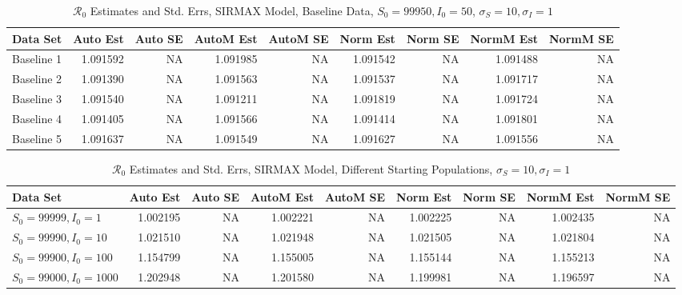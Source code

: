 \documentclass[12pt]{article}
\newcommand{\rr}{\ensuremath{\mathcal{R}_0}}
\begin{document}
\begin{table}[H]
	
	\caption{$\rr$ Estimates and Std. Errs, SIRMAX Model,
		Baseline Data, $S_0 = 99950, I_0 = 50$, 
		$\sigma_S = 10, \sigma_I = 1$}
	\begin{footnotesize}
		\hskip -1cm
	\begin{tabular}{l|r|r|r|r|r|r|r|r}
		\hline
		Data Set & Auto Est & Auto SE & AutoM Est & AutoM SE & Norm Est & Norm SE & NormM Est & NormM SE\\
		\hline
		Baseline 1 & 1.091592 & NA & 1.091985 & NA & 1.091542 & NA & 1.091488 & NA\\
		\hline
		Baseline 2 & 1.091390 & NA & 1.091563 & NA & 1.091537 & NA & 1.091717 & NA\\
		\hline
		Baseline 3 & 1.091540 & NA & 1.091211 & NA & 1.091819 & NA & 1.091724 & NA\\
		\hline
		Baseline 4 & 1.091405 & NA & 1.091566 & NA & 1.091414 & NA & 1.091801 & NA\\
		\hline
		Baseline 5 & 1.091637 & NA & 1.091549 & NA & 1.091627 & NA & 1.091556 & NA\\
		\hline
	\end{tabular}
\end{footnotesize}
\end{table}

\begin{table}[H]
	
	\caption{$\rr$ Estimates and Std. Errs, SIRMAX Model,
		Different Starting Populations, 
		$\sigma_S = 10, \sigma_I = 1$}
	\begin{footnotesize}
		\hskip -1.7cm
	\begin{tabular}{l|r|r|r|r|r|r|r|r}
		\hline
		Data Set & Auto Est & Auto SE & AutoM Est & AutoM SE & Norm Est & Norm SE & NormM Est & NormM SE\\
		\hline
		$S_0 = 99999, I_0 = 1$ & 1.002195 & NA & 1.002221 & NA & 1.002225 & NA & 1.002435 & NA\\
		\hline
		$S_0 = 99990, I_0 = 10$ & 1.021510 & NA & 1.021948 & NA & 1.021505 & NA & 1.021804 & NA\\
		\hline
		$S_0 = 99900, I_0 = 100$ & 1.154799 & NA & 1.155005 & NA & 1.155144 & NA & 1.155213 & NA\\
		\hline
		$S_0 = 99000, I_0 = 1000$ & 1.202948 & NA & 1.201580 & NA & 1.199981 & NA & 1.196597 & NA\\
		\hline
	\end{tabular}
\end{footnotesize}
\end{table}
\end{document}
